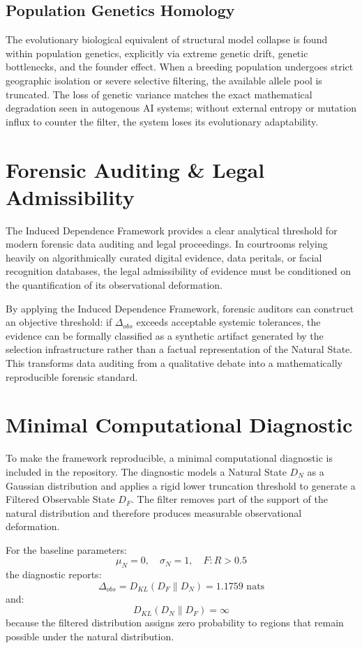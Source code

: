 \documentclass[11pt,twocolumn]{article}
\begin{document}
\subsection{Population Genetics Homology}
The evolutionary biological equivalent of structural model collapse is found within population genetics, explicitly via extreme genetic drift, genetic bottlenecks, and the founder effect. When a breeding population undergoes strict geographic isolation or severe selective filtering, the available allele pool is truncated. The loss of genetic variance matches the exact mathematical degradation seen in autogenous AI systems; without external entropy or mutation influx to counter the filter, the system loses its evolutionary adaptability.

\section{Forensic Auditing \& Legal Admissibility}
The Induced Dependence Framework provides a clear analytical threshold for modern forensic data auditing and legal proceedings. In courtrooms relying heavily on algorithmically curated digital evidence, data peritals, or facial recognition databases, the legal admissibility of evidence must be conditioned on the quantification of its observational deformation.

By applying the Induced Dependence Framework, forensic auditors can construct an objective threshold: if $\Delta_{obs}$ exceeds acceptable systemic tolerances, the evidence can be formally classified as a synthetic artifact generated by the selection infrastructure rather than a factual representation of the Natural State. This transforms data auditing from a qualitative debate into a mathematically reproducible forensic standard.

\section{Minimal Computational Diagnostic}
To make the framework reproducible, a minimal computational diagnostic is included in the repository. The diagnostic models a Natural State $D_N$ as a Gaussian distribution and applies a rigid lower truncation threshold to generate a Filtered Observable State $D_F$. The filter removes part of the support of the natural distribution and therefore produces measurable observational deformation.

For the baseline parameters:
\begin{equation}
\mu_N = 0,\quad \sigma_N = 1,\quad F: R > 0.5
\end{equation}
the diagnostic reports:
\begin{equation}
\Delta_{obs} = D_{KL}(D_F \parallel D_N) = 1.1759 \text{ nats}
\end{equation}
and:
\begin{equation}
D_{KL}(D_N \parallel D_F) = \infty
\end{equation}
because the filtered distribution assigns zero probability to regions that remain possible under the natural distribution.
\end{document}
